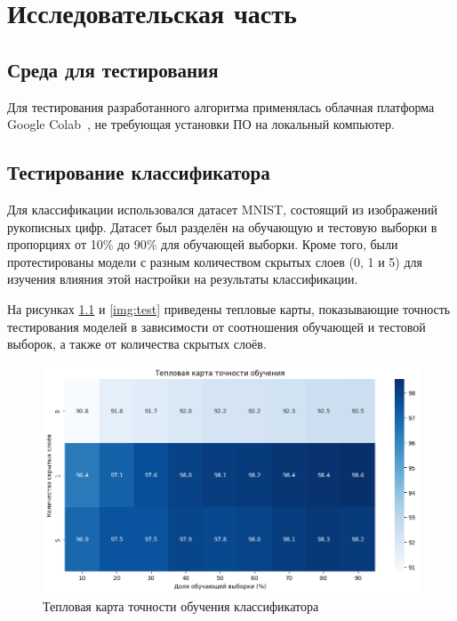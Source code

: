 \chapter{Исследовательская часть}

\section{Среда для тестирования}

Для тестирования разработанного алгоритма применялась облачная платформа Google Colab~\cite{colab}, не требующая установки ПО на локальный компьютер.

% 

\section{Тестирование классификатора}

Для классификации использовался датасет MNIST, состоящий из изображений рукописных цифр. Датасет был разделён на обучающую и тестовую выборки в пропорциях от 10\% до 90\% для обучающей выборки. Кроме того, были протестированы модели с разным количеством скрытых слоев (0, 1 и 5) для изучения влияния этой настройки на результаты классификации.

На рисунках \ref{img:learn} и \ref{img:test} приведены тепловые карты, показывающие точность тестирования моделей в зависимости от соотношения обучающей и тестовой выборок, а также от количества скрытых слоёв.

\begin{figure}
	\begin{center}
		\includegraphics[width=\textwidth]{images/heatmap.png}
	\end{center}
	\caption{Тепловая карта точности обучения классификатора}
	\label{img:learn}
\end{figure}

